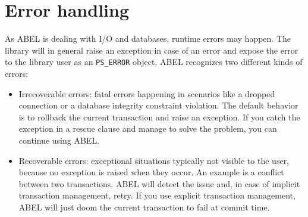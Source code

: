 \documentclass[a4paper,12pt]{report}
\begin{document}
% 
% 

\chapter{Error handling}

As ABEL is dealing with I/O and databases, runtime errors may happen. 
The library will in general raise an exception in case of an error and expose the error to the library user as an \lstinline!PS_ERROR! object.
ABEL recognizes two different kinds of errors:

\begin{itemize}

\item Irrecoverable errors:  fatal errors happening in scenarios like a dropped connection or a database integrity constraint violation.
The default behavior is to rollback the current transaction and raise an exception. 
If you catch the exception in a rescue clause and manage to solve the problem, you can continue using ABEL.

\item Recoverable errors: exceptional situations typically not visible to the user, because no exception is raised when they occur.
An example is a conflict between two transactions.
ABEL will detect the issue and, in case of implicit transaction management, retry.
If you use explicit transaction management, ABEL will just doom the current transaction to fail at commit time.
\end{itemize}
\end{document}
